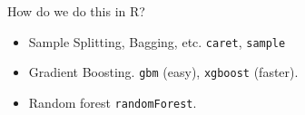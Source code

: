 \documentclass[xcolor=pdftex,dvipsnames,table,mathserif,aspectratio=169]{beamer}
\begin{document}
\begin{frame}{How do we do this in R?}
\begin{itemize}
\item Sample Splitting, Bagging, etc. \texttt{caret}, \texttt{sample}
\item Gradient Boosting. \texttt{gbm} (easy), \texttt{xgboost} (faster).
\item Random forest \texttt{randomForest}.
\end{itemize}
\end{frame}
\end{document}
